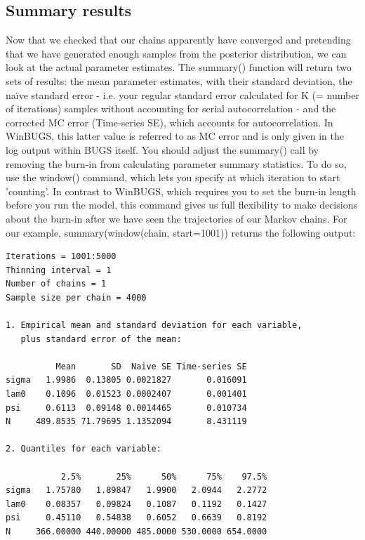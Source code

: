 \subsection{Summary results}
Now that we checked that our chains apparently have converged and pretending that we have generated enough samples from the posterior distribution, we can look at the actual parameter estimates. The summary() function will return two sets of results: the mean parameter estimates, with their standard deviation, the naïve standard error - i.e. your regular standard error calculated for K (= number of iterations) samples without accounting for serial autocorrelation - and the corrected MC error (Time-series SE), which accounts for autocorrelation. In WinBUGS, this latter value is referred to as MC error and is only given in the log output within BUGS itself. 
You should adjust the summary() call by removing the burn-in from
calculating parameter summary statistics. To do so, use the window()
command, which lets you specify at which iteration to start
'counting'. In contrast to WinBUGS, which requires you to set the
burn-in length before you run the model, this command gives us full
flexibility to make decisions about the burn-in after we have seen the
trajectories of our Markov chains. For our example,
summary(window(chain, start=1001)) returns the following output:


\begin{verbatim}
Iterations = 1001:5000
Thinning interval = 1 
Number of chains = 1 
Sample size per chain = 4000 

1. Empirical mean and standard deviation for each variable,
   plus standard error of the mean:

          Mean       SD  Naive SE Time-series SE
sigma   1.9986  0.13805 0.0021827       0.016091
lam0    0.1096  0.01523 0.0002407       0.001401
psi     0.6113  0.09148 0.0014465       0.010734
N     489.8535 71.79695 1.1352094       8.431119

2. Quantiles for each variable:

           2.5%       25%      50%      75%    97.5%
sigma   1.75780   1.89847   1.9900   2.0944   2.2772
lam0    0.08357   0.09824   0.1087   0.1192   0.1427
psi     0.45110   0.54838   0.6052   0.6639   0.8192
N     366.00000 440.00000 485.0000 530.0000 654.0000
\end{verbatim}

